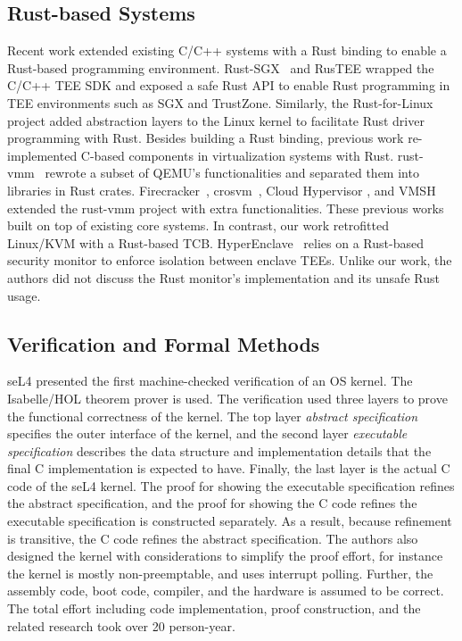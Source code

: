 \subsection{Rust-based Systems}
Recent work extended existing C/C++ systems with a Rust binding to enable
a Rust-based programming environment. Rust-SGX~\cite{rustsgx} and RusTEE
\cite{rustee} wrapped the C/C++ TEE SDK and exposed a safe Rust API
to enable Rust programming in TEE environments such as SGX and TrustZone.
Similarly, the Rust-for-Linux~\cite{Rust-for-Linux} project added
abstraction layers to the Linux kernel to facilitate Rust driver
programming with Rust.
Besides building a Rust binding, previous work re-implemented C-based
components in virtualization systems with Rust.
rust-vmm~\cite{rust-vmm} rewrote a subset of QEMU's functionalities
and separated them into libraries in Rust crates.
Firecracker~\cite{Firecracker}, crosvm~\cite{crosvm}, Cloud Hypervisor
\cite{CloudHypervisor}, and VMSH~\cite{VMSH} extended the
rust-vmm project with extra functionalities. These previous works
built on top of existing core systems. In contrast, our work
retrofitted Linux/KVM with a Rust-based TCB.
HyperEnclave~\cite{hyperenclave} relies on a Rust-based security
monitor to enforce isolation between enclave TEEs. Unlike
our work, the authors did not discuss the Rust monitor's implementation
and its unsafe Rust usage.

\subsection{Verification and Formal Methods}

seL4 \cite{sel4} presented the first machine-checked verification of an OS
kernel. The Isabelle/HOL theorem prover is used. The verification used
three layers to prove the functional correctness of the kernel.
The top layer \textit{abstract specification} specifies the outer
interface of the kernel, and the second layer \textit{executable specification}
describes the data structure and implementation details that the final C
implementation is expected to have. Finally, the last layer is the actual
C code of the seL4 kernel. The proof for showing the executable specification
refines the abstract specification, and the proof for showing the C code
refines the executable specification is constructed separately. As a result,
because refinement is transitive, the C code refines the abstract specification.
The authors also designed the kernel with considerations to simplify the proof
effort, for instance the kernel is mostly non-preemptable, and uses interrupt
polling. Further, the assembly code, boot code, compiler, and the hardware is
assumed to be correct. The total effort including code implementation, proof
construction, and the related research took over 20 person-year.

